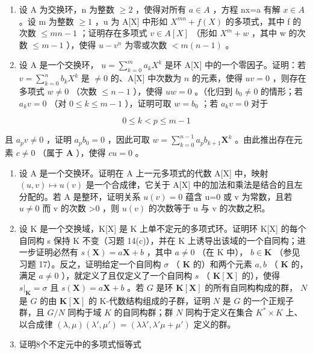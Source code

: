 \begin{enumerate}
\def\labelenumi{\arabic{enumi}.}
\setcounter{enumi}{14}
\item
  设 A 为交换环，n 为整数 \(\geqslant2\) ，使得对所有 \(a\in A\) ，方程 nx=a 有解 \(x\in A\) 。设 m 为整数 \(\geqslant1\) ，u 为 A{[}X{]} 中形如 \(X^{mn}+f(X)\) 的多项式，其中 f 的次数 \(\leqslant mn-1\) ；证明存在多项式 \(v\in A[X]\) （形如 \(X^{m}+w\) ，其中 w 的次数 \(\leqslant m-1\) ），使得 \(u-v^{n}\) 为零或次数 \(<m(n-1)\) 。
\item
  设 A 是一个交换环， \(u = \sum_{k=0}^{m} a_k X^k\) 是环 A{[}X{]} 中的一个零因子。证明：若 \(v = \sum_{k=0}^{n} b_k X^k\) 是 \(\neq 0\) 的、A{[}X{]} 中次数为 \(n\) 的元素，使得 \(uv = 0\) ，则存在多项式 \(w \neq 0\) （次数 \(\leqslant n - 1\) ），使得 \(uw = 0\) 。（化归到 \(b_0 \neq 0\) 的情形；若 \(a_k v = 0\) （对 \(0 \leqslant k \leqslant m - 1\) ），证明可取 \(w = b_0\) ；若 \(a_k v = 0\) 对于
\end{enumerate}

\[
0 \leqslant k <   p \leqslant m - 1
\]

且 \(a_{p}v \neq 0\) ，证明 \(a_{p}b_{0} = 0\) ，因此可取 \(w = \sum_{k=0}^{n-1} a_{p}b_{k+1}\mathbf{X}^{k}\) 。由此推出存在元素 \(c \neq 0\) （属于 \(\mathbf{A}\) ），使得 \(cu = 0\) 。

\begin{enumerate}
\def\labelenumi{\arabic{enumi}.}
\setcounter{enumi}{16}
\item
  设 A 是一个交换环。证明在 A 上一元多项式的代数 A{[}X{]} 中，映射 \((u,v)\mapsto u(v)\) 是一个合成律，它关于 A{[}X{]} 中的加法和乘法是结合的且左分配的。若 A 是整环，证明关系 \(u(v)=0\) 蕴含 u=0 或 v 为常数，且若 \(u\neq0\) 而 v 的次数 \textgreater0 ，则 \(u(v)\) 的次数等于 u 与 v 的次数之积。
\item
  设 K 是一个交换域，K{[}X{]} 是 K 上单不定元的多项式环。证明环 K{[}X{]} 的每个自同构 s 保持 K 不变（习题 14(c)），并在 K 上诱导出该域的一个自同构；进一步证明必然有 \(s(\mathbf{X}) = a\mathbf{X} + b\) ，其中 \(a \neq 0\) （在 K 中）， \(b \in \mathbf{K}\) （参见习题 17）。反之，证明给定一个自同构 \(\sigma\) （ \(\mathbf{K}\) 的）和两个元素 \(a, b\) （ \(\mathbf{K}\) 的，满足 \(a \neq 0\) ），就定义了且仅定义了一个自同构 \(s\) （ \(\mathbf{K}[\mathbf{X}]\) 的），使得 \(s|_{\mathbf{K}} = \sigma\) 且 \(s(\mathbf{X}) = a\mathbf{X} + b\) 。若 \(G\) 是环 \(\mathbf{K}[\mathbf{X}]\) 的所有自同构构成的群， \(N\) 是 \(G\) 的由 \(\mathbf{K}[\mathbf{X}]\) 的 K-代数结构组成的子群，证明 \(N\) 是 \(G\) 的一个正规子群，且 \(G / N\) 同构于域 \(K\) 的自同构群；群 \(N\) 同构于定义在集合 \(K^* \times K\) 上、以合成律 \((\lambda, \mu)(\lambda', \mu') = (\lambda\lambda', \lambda' \mu + \mu')\) 定义的群。
\item
  证明8个不定元中的多项式恒等式
\end{enumerate}

